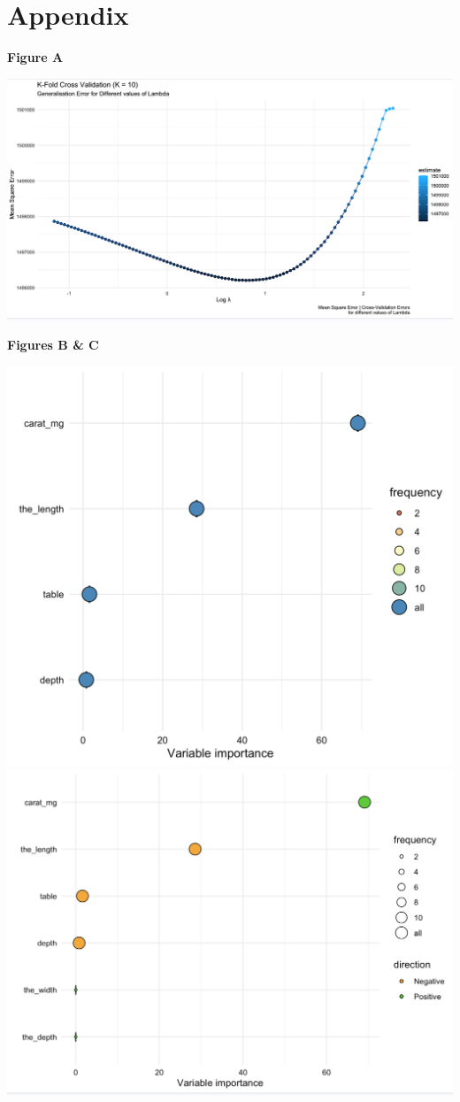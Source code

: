 \documentclass[
]{article}
\begin{document}
\hypertarget{appendix}{%
\section{Appendix}\label{appendix}}

\textbf{Figure A}

\begin{center}\includegraphics[width=0.8\linewidth]{Images/Generalisation_Error} \end{center}

\textbf{Figures B \& C}

\includegraphics[width=0.55\linewidth]{Images/Variable_Importance}
\includegraphics[width=0.55\linewidth]{Images/Vaariable_Importance2}
\end{document}

